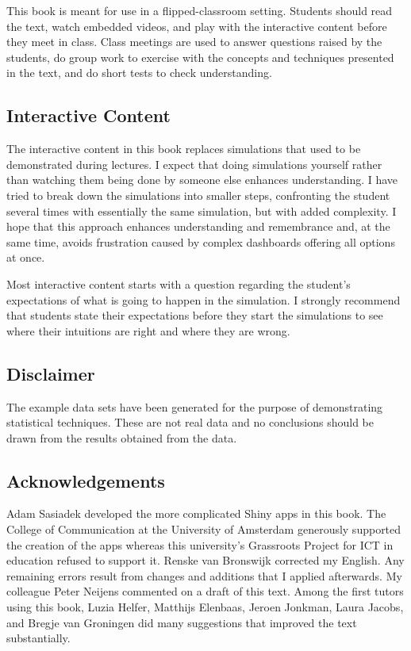 \documentclass[a4paper]{book}
\theoremstyle{definition}
\theoremstyle{definition}
\theoremstyle{definition}
\theoremstyle{remark}
\begin{document}
This book is meant for use in a flipped-classroom setting. Students
should read the text, watch embedded videos, and play with the
interactive content before they meet in class. Class meetings are used
to answer questions raised by the students, do group work to exercise
with the concepts and techniques presented in the text, and do short
tests to check understanding.

\subsection*{Interactive Content}\label{interactive-content}

The interactive content in this book replaces simulations that used to
be demonstrated during lectures. I expect that doing simulations
yourself rather than watching them being done by someone else enhances
understanding. I have tried to break down the simulations into smaller
steps, confronting the student several times with essentially the same
simulation, but with added complexity. I hope that this approach
enhances understanding and remembrance and, at the same time, avoids
frustration caused by complex dashboards offering all options at once.

Most interactive content starts with a question regarding the student's
expectations of what is going to happen in the simulation. I strongly
recommend that students state their expectations before they start the
simulations to see where their intuitions are right and where they are
wrong.

\subsection*{Disclaimer}\label{disclaimer}

The example data sets have been generated for the purpose of
demonstrating statistical techniques. These are not real data and no
conclusions should be drawn from the results obtained from the data.

\subsection*{Acknowledgements}\label{acknowledgements}

Adam Sasiadek developed the more complicated Shiny apps in this book.
The College of Communication at the University of Amsterdam generously
supported the creation of the apps whereas this university's Grassroots
Project for ICT in education refused to support it. Renske van Bronswijk
corrected my English. Any remaining errors result from changes and
additions that I applied afterwards. My colleague Peter Neijens
commented on a draft of this text. Among the first tutors using this
book, Luzia Helfer, Matthijs Elenbaas, Jeroen Jonkman, Laura Jacobs, and Bregje van Groningen did many suggestions that
improved the text substantially.
\end{document}
